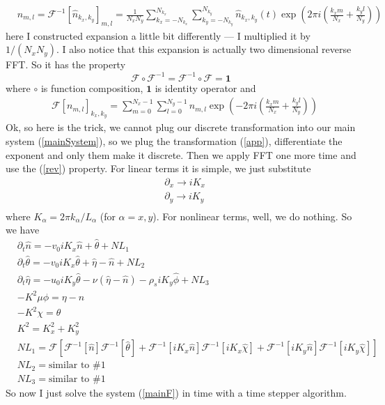 \documentclass[preprint,aip,pop]{article}
\begin{document}
\begin{align}
  & n_{m,l} = \mathcal{F}^{-1} \left [ \hat{n}_{k_x,k_y} \right ]_{m,l}  = \frac{1}{N_x N_y}  \sum_{k_x = -N_{k_x}}^{N_{k_x}} \sum_{k_y = -N_{k_y}}^{N_{k_y}}   \hat{n}_{k_x,k_y}(t) \exp \left ( 2\pi i \left ( \frac{k_x m}{N_x} + \frac{k_y l} {N_y} \right ) \right ) 
\end{align}
here I constructed expansion a little bit differently --- I multiplied it by
$1/(N_x N_y)$. I also notice that this expansion is actually two dimensional
reverse FFT. So it has the property
\begin{equation}
  \mathcal{F} \circ \mathcal{F}^{-1} =  \mathcal{F}^{-1} \circ \mathcal{F} =\mathbf{1} \label{rev}
\end{equation}
where $\circ$ is function composition, $\mathbf{1}$ is identity operator and
\begin{align}
  &  \mathcal{F} \left [ n_{m,l} \right ]_{k_x,k_y}  =
    \sum_{m = 0}^{N_{x} -1} \sum_{l = 0}^{N_{y} - 1}
    n_{m,l} \exp \left (- 2\pi i \left ( \frac{k_x m}{N_x} + \frac{k_y l} {N_y} \right ) \right ) 
\end{align}
Ok, so here is the trick, we cannot plug our discrete transformation into our
main system (\ref{mainSystem}), so we plug the transformation (\ref{app}),
differentiate the exponent and only them make it discrete. Then we apply FFT one
more time and use the (\ref{rev}) property.
For linear terms it is simple, we just substitute
\begin{align}
  & \partial_x \rightarrow i K_x \\
  & \partial_y \rightarrow i K_y \\
\end{align}
where $K_{\alpha} = 2\pi k_\alpha/L_\alpha$ (for $\alpha = x,y$).
For nonlinear terms, well, we do nothing.
So we have
\begin{subequations}
\begin{align}
  & \partial_t \hat{n} = -v_0 i K_x  \hat{n}  + \hat{\theta} + NL_1 \\
& \partial_t \hat{\theta}    = -v_0 i K_x  \hat {\theta} + \hat{\eta} - \hat{ n} + NL_2  \\
& \partial_t \hat{\eta}       = -u_0 i K_y \hat{\theta} - \nu (\hat{\eta} - \hat{n}) -
  \rho_s i K_y  \hat{\phi} + NL_3 \\
& -K^2 \mu  \phi = \eta - n \\
&  -K^2 \chi = \theta \\ 
  & K^2 = K_x^2 + K_y^2 \\
  & NL_1 = 
    \mathcal{F} \left [    
\mathcal{F}^{-1} \left [ \hat{n} \right ]  \mathcal{F}^{-1} \left [ \hat{\theta} \right ] 
+
\mathcal{F}^{-1} \left [iK_x \hat{n} \right ]  \mathcal{F}^{-1} \left [ iK_x \hat{\chi} \right ] 
+
\mathcal{F}^{-1} \left [ iK_y \hat{n} \right ]  \mathcal{F}^{-1} \left [ iK_y \hat{\chi} \right ] 
\right ]
\\
  & NL_2 = \mbox{similar to \#1} \\
  & NL_3 = \mbox{similar to \#1} 
\end{align}
\label{mainF}
\end{subequations}
So now I just solve the system (\ref{mainF}) in time with a time stepper algorithm.
\end{document}

